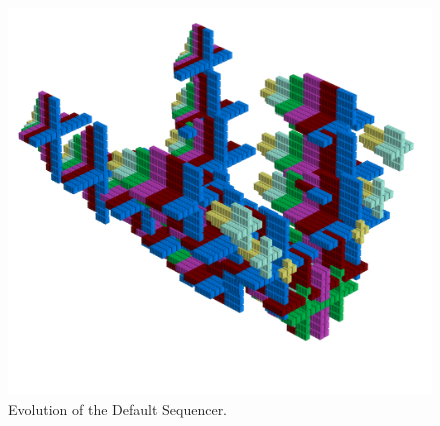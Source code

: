 \clearpage                                                                 
\begin{figure}[H]                                                          
    \centering                                                             
    \begin{adjustbox}{width=14cm,center, margin= 0cm 2cm}                                   
      \includegraphics[width=14cm]{src/sequencer/pattern0-45.png}%
    \end{adjustbox}                                                        
\caption{Evolution of the Default Sequencer.}                                           
\end{figure}                                                               
\clearpage                                                                 
                                                                           
